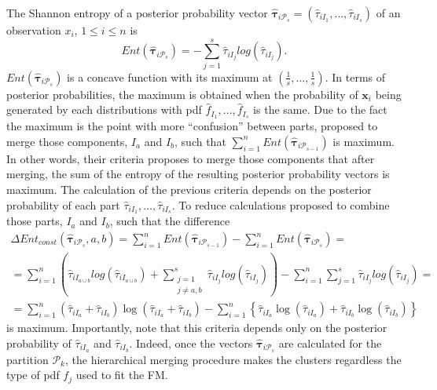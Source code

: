 \documentclass[10pt, a4paper]{article}
\newcommand{\m}[1]{\boldsymbol{#1}}
\begin{document}
\begin{spacing}{1.9}
The Shannon entropy of a posterior probability vector $\hat{\m\tau}_{i \mathcal{P}_s} = \left( \hat{\tau}_{i I_1} , \dots, \hat{\tau}_{i I_s}  \right)$ of an observation $x_i$, $1 \leq i \leq n$ is
\[
Ent( \hat{\m \tau}_{i \mathcal{P}_s} ) = - \sum_{j=1}^s \hat{\tau}_{i I_j}  log(\hat{\tau}_{i I_j} ).
\]
$Ent( \hat{\m \tau}_{i \mathcal{P}_s} )$ is a concave function with its maximum at $(\frac{1}{s},\dots,\frac{1}{s})$. In terms of posterior probabilities, the maximum is obtained when the probability of $\m x_i$ being generated by each distributions with pdf $\hat{f}_{I_1}, \dots, \hat{f}_{I_s}$ is the same. Due to the fact the maximum is the point with more ``confusion'' between parts, \cite{baudry2010combining} proposed to merge those components, $I_a$ and $I_b$, such that $\sum_{i=1}^n Ent( \hat{\m \tau}_{i \mathcal{P}_{s-1}} )$ is maximum. In other words, their criteria proposes to merge those components that after merging, the sum of the entropy of the resulting posterior probability vectors is maximum. The calculation of the previous criteria depends on the posterior probability of each part $\hat{\tau}_{i I_1}, \dots,\hat{\tau}_{i I_s}$. To reduce calculations \cite{baudry2010combining} proposed to combine those parts, $I_a$ and $I_b$, such that the difference
\begin{multline*}
\Delta Ent_{const}(\hat{\m \tau}_{i \mathcal{P}_s}, a, b) = \sum_{i=1}^n Ent( \hat{\m \tau}_{i \mathcal{P}_{s-1}}) - \sum_{i=1}^n Ent( \hat{\m \tau}_{i \mathcal{P}_s}) =  \\ = \sum_{i=1}^n  \left( \hat{\tau}_{i I_{a\cup b}}  log(\hat{\tau}_{i I_{a\cup b}} ) +  \sum_{\substack{j=1 \\
                                                            j \neq a, b}}^s \hat{\tau}_{i I_j}  log(\hat{\tau}_{i I_j} ) \right)  - \sum_{i=1}^n \sum_{j=1}^s \hat{\tau}_{i I_j}  log(\hat{\tau}_{i I_j} ) = \\  =   \sum_{i=1}^n  (\hat{\tau}_{i I_a}+\hat{\tau}_{i I_b}) \log(\hat{\tau}_{iI_a} + \hat{\tau}_{i I_b}) - \sum_{i=1}^n \left\{ \hat{\tau}_{i I_a} \log(\hat{\tau}_{i I_a}) + \hat{\tau}_{iI_b} \log(\hat{\tau}_{i I_b})\right\}
\end{multline*}
is maximum. Importantly, note that this criteria depends only on the posterior probability of $\hat{\tau}_{iI_a}$ and $\hat{\tau}_{iI_b}$. Indeed, once the vectors $\hat{\m\tau}_{i \mathcal{P}_s}$ are calculated for the partition $\mathcal{P}_k$, the hierarchical merging procedure makes the clusters regardless the type of pdf $f_j$ used to fit the FM.


\end{spacing}
\end{document}
